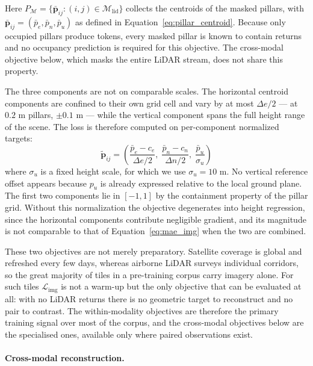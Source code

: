 \documentclass{book}
\begin{document}
Here $P_{\mathcal{M}} = \{\bar{\mathbf{p}}_{ij} : (i,j) \in
\mathcal{M}_{\text{lid}}\}$ collects the centroids of the masked
pillars, with $\bar{\mathbf{p}}_{ij} = (\bar{p}_e, \bar{p}_n,
\bar{p}_u)$ as defined in Equation~\eqref{eq:pillar_centroid}.
Because only occupied pillars produce tokens, every masked pillar is
known to contain returns and no occupancy prediction is required for
this objective.  The cross-modal objective below, which masks the
entire LiDAR stream, does not share this property.

The three components are not on comparable scales.  The horizontal
centroid components are confined to their own grid cell and vary by
at most $\Delta e / 2$ --- at $0.2$ m pillars, $\pm 0.1$ m --- while
the vertical component spans the full height range of the scene.
The loss is therefore computed on per-component normalized targets:
\begin{equation}
  \tilde{\mathbf{p}}_{ij} =
  \left(
    \frac{\bar{p}_e - c_e}{\Delta e / 2},\;
    \frac{\bar{p}_n - c_n}{\Delta n / 2},\;
    \frac{\bar{p}_u}{\sigma_u}
  \right)
  \label{eq:centroid_normalized}
\end{equation}
where $\sigma_u$ is a fixed height scale, for which we use
$\sigma_u = 10$ m.  No vertical reference offset appears because
$p_u$ is already expressed relative to the local ground plane.  The
first two components lie in $[-1, 1]$ by the containment property of
the pillar grid.  Without this normalization the objective
degenerates into height regression, since the horizontal components
contribute negligible gradient, and its magnitude is not comparable
to that of Equation~\eqref{eq:mae_img} when the two are combined.

These two objectives are not merely preparatory.  Satellite
coverage is global and refreshed every few days, whereas airborne
LiDAR surveys individual corridors, so the great majority of tiles
in a pre-training corpus carry imagery alone.  For such tiles
$\mathcal{L}_{\text{img}}$ is not a warm-up but the only objective
that can be evaluated at all: with no LiDAR returns there is no
geometric target to reconstruct and no pair to contrast.  The
within-modality objectives are therefore the primary training
signal over most of the corpus, and the cross-modal objectives
below are the specialised ones, available only where paired
observations exist.

\paragraph{Cross-modal reconstruction.}
\end{document}
